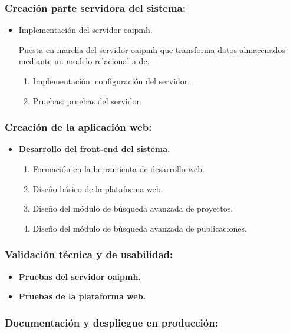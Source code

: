 \subsubsection{Creación parte servidora del sistema:}

\begin{itemize}
	\item Implementación del servidor \acrshort{oaipmh}.

	Puesta en marcha del servidor \acrshort{oaipmh} que transforma datos almacenados mediante un modelo relacional a \acrshort{dc}.

	\begin{enumerate}
		\item Implementación: configuración del servidor.
		\item Pruebas: pruebas del servidor.
	\end{enumerate}
\end{itemize}

\subsubsection{Creación de la aplicación web:}

\begin{itemize}
	\item \textbf{Desarrollo del front-end del sistema.}
	\begin{enumerate}
		\item Formación en la herramienta de desarrollo web.
		\item Diseño básico de la plataforma web.
		\item Diseño del módulo de búsqueda avanzada de proyectos.
		\item Diseño del módulo de búsqueda avanzada de publicaciones.
	\end{enumerate}	
\end{itemize}

\subsubsection{Validación técnica y de usabilidad:}

\begin{itemize}
	\item \textbf{Pruebas del servidor \acrshort{oaipmh}.}
	\item \textbf{Pruebas de la plataforma web.}
\end{itemize}

\subsubsection{Documentación y despliegue en producción:}

